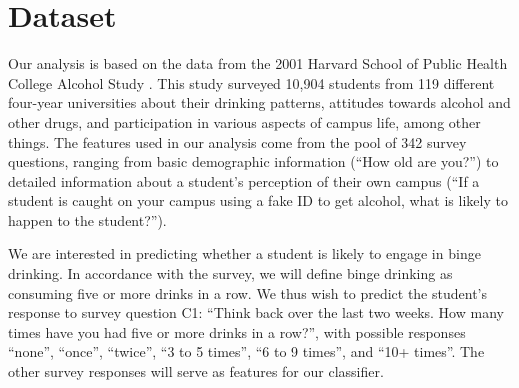 \section{Dataset}
\label{sec:data}

Our analysis is based on the data from the 2001 Harvard School of Public Health College Alcohol Study \cite{survey}.  This study surveyed 10,904 students from 119 different four-year universities about their drinking patterns, attitudes towards alcohol and other drugs, and participation in various aspects of campus life, among other things.  The features used in our analysis come from the pool of 342 survey questions, ranging from basic demographic information (``How old are you?'') to detailed information about a student's perception of their own campus (``If a student is caught on your campus using a fake ID to get alcohol, what is likely to happen to the student?'').

We are interested in predicting whether a student is likely to engage in binge drinking.  In accordance with the survey, we will define binge drinking as consuming five or more drinks in a row.  We thus wish to predict the student's response to survey question C1: ``Think back over the last two weeks. How many times have you had five or more drinks in a row?'', with possible responses ``none'', ``once'', ``twice'', ``3 to 5 times'', ``6 to 9 times'', and ``10+ times''.  The other survey responses will serve as features for our classifier.